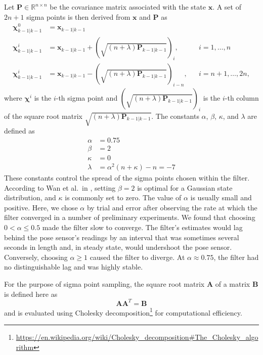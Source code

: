 Let $\mathbf{P} \in \mathbb{R}^{n \times n}$ be the covariance matrix associated with the state $\mathbf{x}$. A set of $2n + 1$ sigma points is then derived from $\mathbf{x}$ and $\mathbf{P}$ as
%
\begin{align}
\bm{\chi}^{0}_{k-1 | k-1} &= \mathbf{x}_{k-1 | k-1} \nonumber\\
\bm{\chi}^{i}_{k-1 | k-1} &= \mathbf{x}_{k-1 | k-1} + \left( \sqrt{\left( n + \lambda \right) \mathbf{P}_{k-1 | k-1}} \right)_{i}, &&i = 1, \dots, n \\
\bm{\chi}^{i}_{k-1 | k-1} &= \mathbf{x}_{k-1 | k-1} - \left( \sqrt{\left( n + \lambda \right) \mathbf{P}_{k-1 | k-1}} \right)_{i-n}, &&i = n+1, \dots, 2n, \nonumber
\end{align}
%
where $\bm{\chi}^{i}$ is the $i$-th sigma point and $\left( \sqrt{\left( n + \lambda \right) \mathbf{P}_{k-1 | k-1}} \right)_{i}$ is the $i$-th column of the square root matrix $\sqrt{\left( n + \lambda \right) \mathbf{P}_{k-1 | k-1}}$. The constants $\alpha$, $\beta$, $\kappa$, and $\lambda$ are defined as
%
\begin{align}
\alpha &= 0.75 \\
\beta &= 2 \\
\kappa &= 0 \\
\lambda &= \alpha^{2} \left( n + \kappa \right) - n = -7
\end{align}
%
These constants control the spread of the sigma points chosen within the filter. According to Wan et al.\ in \cite{Wan2000}, setting $\beta = 2$ is optimal for a Gaussian state distribution, and $\kappa$ is commonly set to zero. The value of $\alpha$ is usually small and positive. Here, we chose $\alpha$ by trial and error after observing the rate at which the filter converged in a number of preliminary experiments. We found that choosing $0 < \alpha \leq 0.5$ made the filter slow to converge. The filter's estimates would lag behind the pose sensor's readings by an interval that was sometimes several seconds in length and, in steady state, would undershoot the pose sensor. Conversely, choosing $\alpha \geq 1$ caused the filter to diverge. At $\alpha \approx 0.75$, the filter had no distinguishable lag and was highly stable.

For the purpose of sigma point sampling, the square root matrix $\mathbf{A}$ of a matrix $\mathbf{B}$ is defined here as
%
\begin{equation}
\mathbf{A} \mathbf{A}^{T} = \mathbf{B}
\end{equation}
%
and is evaluated using Cholesky decomposition\footnote{\url{https://en.wikipedia.org/wiki/Cholesky_decomposition\#The_Cholesky_algorithm}} for computational efficiency.

